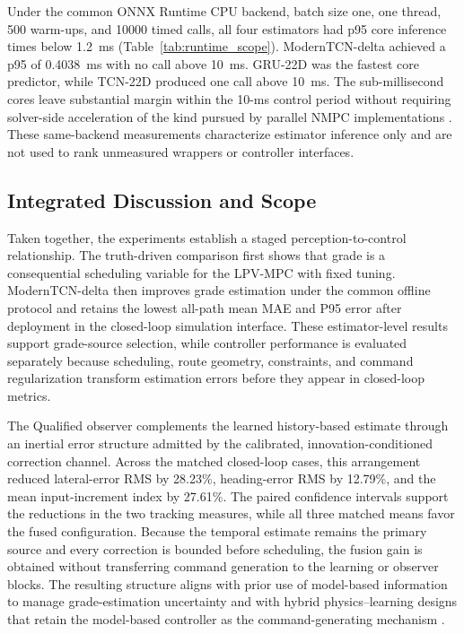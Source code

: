 \documentclass{ieeeaccess}
\newcommand{\citep}[1]{\cite{#1}}
\begin{document}
Under the common ONNX Runtime CPU backend, batch size one, one thread, 500 warm-ups, and 10000 timed calls, all four estimators had p95 core inference times below 1.2~ms (Table~\ref{tab:runtime_scope}). ModernTCN-delta achieved a p95 of 0.4038~ms with no call above 10~ms. GRU-22D was the fastest core predictor, while TCN-22D produced one call above 10~ms. The sub-millisecond cores leave substantial margin within the 10-ms control period without requiring solver-side acceleration of the kind pursued by parallel NMPC implementations \citep{Xu2024ParallelNMPC}. These same-backend measurements characterize estimator inference only and are not used to rank unmeasured wrappers or controller interfaces.

\subsection{Integrated Discussion and Scope}

Taken together, the experiments establish a staged perception-to-control relationship. The truth-driven comparison first shows that grade is a consequential scheduling variable for the LPV-MPC with fixed tuning. ModernTCN-delta then improves grade estimation under the common offline protocol and retains the lowest all-path mean MAE and P95 error after deployment in the closed-loop simulation interface. These estimator-level results support grade-source selection, while controller performance is evaluated separately because scheduling, route geometry, constraints, and command regularization transform estimation errors before they appear in closed-loop metrics.

The Qualified observer complements the learned history-based estimate through
an inertial error structure admitted by the calibrated,
innovation-conditioned correction channel. Across the matched closed-loop
cases, this arrangement reduced lateral-error RMS by 28.23\%, heading-error
RMS by 12.79\%, and the mean input-increment index by 27.61\%. The paired
confidence intervals support the reductions in the two tracking measures,
while all three matched means favor the fused configuration. Because the
temporal estimate remains the primary source and every correction
is bounded before scheduling, the fusion gain is obtained without transferring
command generation to the learning or observer blocks. The resulting structure aligns
with prior use of model-based information to manage grade-estimation
uncertainty \citep{Liu2023RoadSlopeAAIMM,Gao2024RoadSlopeHDV,Feng2021MultiModelFusion} and with hybrid
physics--learning designs that retain the model-based controller as the
command-generating mechanism \citep{Zheng2024HybridPhysicsLearningUSV}.
\end{document}
